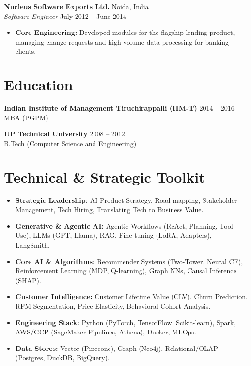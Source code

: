 \documentclass[11pt,a4paper]{article}
\begin{document}
\vspace{0.5em}

\noindent \textbf{Nucleus Software Exports Ltd.} \hfill Noida, India \\
\textit{Software Engineer} \hfill July 2012 -- June 2014
\begin{itemize}[leftmargin=*, label=\textbullet]
    \item \textbf{Core Engineering:} Developed modules for the flagship lending product, managing change requests and high-volume data processing for banking clients.
\end{itemize}

\section*{Education}
\noindent \textbf{Indian Institute of Management Tiruchirappalli (IIM-T)} \hfill 2014 -- 2016 \\
MBA (PGPM)

\vspace{0.5em}

\noindent \textbf{UP Technical University} \hfill 2008 -- 2012 \\
B.Tech (Computer Science and Engineering)

\section*{Technical \& Strategic Toolkit}
\begin{itemize}[leftmargin=*, label=\textbullet]
    \item \textbf{Strategic Leadership:} AI Product Strategy, Road-mapping, Stakeholder Management, Tech Hiring, Translating Tech to Business Value.
    \item \textbf{Generative \& Agentic AI:} Agentic Workflows (ReAct, Planning, Tool Use), LLMs (GPT, Llama), RAG, Fine-tuning (LoRA, Adapters), LangSmith.
    \item \textbf{Core AI \& Algorithms:} Recommender Systems (Two-Tower, Neural CF), Reinforcement Learning (MDP, Q-learning), Graph NNs, Causal Inference (SHAP).
    \item \textbf{Customer Intelligence:} Customer Lifetime Value (CLV), Churn Prediction, RFM Segmentation, Price Elasticity, Behavioral Cohort Analysis.
    \item \textbf{Engineering Stack:} Python (PyTorch, TensorFlow, Scikit-learn), Spark, AWS/GCP (SageMaker Pipelines, Athena), Docker, MLOps.
    \item \textbf{Data Stores:} Vector (Pinecone), Graph (Neo4j), Relational/OLAP (Postgres, DuckDB, BigQuery).
\end{itemize}
\end{document}
